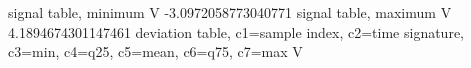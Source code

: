 \expandafter\def\csname oct2tex.alucyl_d50_v800_P.stabmin.d\endcsname{signal table, minimum}
\expandafter\def\csname oct2tex.alucyl_d50_v800_P.stabmin.u\endcsname{\ensuremath{\text{V}}}
\expandafter\def\csname oct2tex.alucyl_d50_v800_P.stabmin.v\endcsname{-3.0972058773040771}
\expandafter\def\csname oct2tex.alucyl_d50_v800_P.stabmax.d\endcsname{signal table, maximum}
\expandafter\def\csname oct2tex.alucyl_d50_v800_P.stabmax.u\endcsname{\ensuremath{\text{V}}}
\expandafter\def\csname oct2tex.alucyl_d50_v800_P.stabmax.v\endcsname{4.1894674301147461}
\expandafter\def\csname oct2tex.alucyl_d50_v800_P.dtab.d\endcsname{deviation table, c1=sample index, c2=time signature, c3=min, c4=q25, c5=mean, c6=q75, c7=max}
\expandafter\def\csname oct2tex.alucyl_d50_v800_P.dtab.u\endcsname{\ensuremath{\text{V}}}

